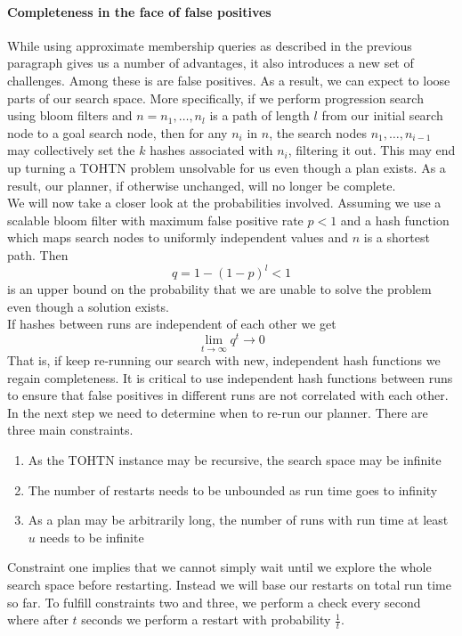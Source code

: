 \paragraph{Completeness in the face of false positives}
\label{ld - completeness}
While using approximate membership queries as described in the previous paragraph gives us a number of advantages, it also introduces a new set of challenges. Among these is are false positives. As a result, we can expect to loose parts of our search space. More specifically, if we perform progression search using bloom filters and $n = n_1, \ldots, n_l$ is a path of length $l$ from our initial search node to a goal search node, then for any $n_i$ in $n$, the search nodes $n_1, \ldots, n_{i-1}$ may collectively set the $k$ hashes associated with $n_i$, filtering it out. This may end up turning a TOHTN problem unsolvable for us even though a plan exists. As a result, our planner, if otherwise unchanged, will no longer be complete. \\
We will now take a closer look at the probabilities involved. Assuming we use a scalable bloom filter with maximum false positive rate $p < 1$ and a hash function which maps search nodes to uniformly independent values and $n$ is a shortest path. Then
\[
q = 1 - (1 - p)^l < 1
\]
is an upper bound on the probability that we are unable to solve the problem even though a solution exists. \\
If hashes between runs are independent of each other we get
\[
\lim_{t \rightarrow \infty} q^t \rightarrow 0
\]
That is, if keep re-running our search with new, independent hash functions we regain completeness. It is critical to use independent hash functions between runs to ensure that false positives in different runs are not correlated with each other. In the next step we need to determine when to re-run our planner. There are three main constraints.
\begin{enumerate}
	\item As the TOHTN instance may be recursive, the search space may be infinite
	\item The number of restarts needs to be unbounded as run time goes to infinity
	\item As a plan may be arbitrarily long, the number of runs with run time at least $u$ needs to be infinite
\end{enumerate}
Constraint one implies that we cannot simply wait until we explore the whole search space before restarting. Instead we will base our restarts on total run time so far. To fulfill constraints two and three, we perform a check every second where after $t$ seconds we perform a restart with probability $\frac{1}{t}$. \\

